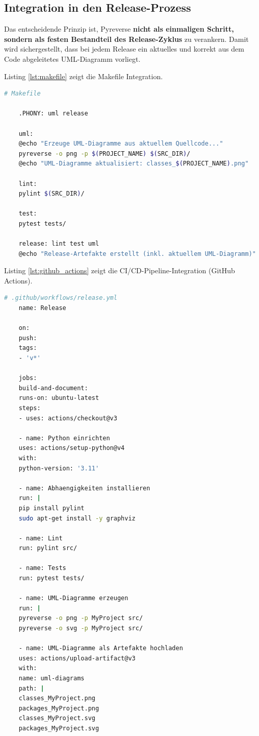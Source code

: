 ﻿\documentclass[a4paper,12pt]{article}
\begin{document}
\subsection{Integration in den Release-Prozess}

Das entscheidende Prinzip ist, Pyreverse \textbf{nicht als einmaligen Schritt,
sondern als festen Bestandteil des Release-Zyklus} zu verankern. Damit wird
sichergestellt, dass bei jedem Release ein aktuelles und korrekt aus dem Code
abgeleitetes UML-Diagramm vorliegt.

Listing \ref{lst:makefile} zeigt die Makefile Integration.
\begin{lstlisting}[language=bash, caption={Makefile mit Pyreverse-Ziel},
	label={lst:makefile}]
	# Makefile
	
	.PHONY: uml release
	
	uml:
	@echo "Erzeuge UML-Diagramme aus aktuellem Quellcode..."
	pyreverse -o png -p $(PROJECT_NAME) $(SRC_DIR)/
	@echo "UML-Diagramme aktualisiert: classes_$(PROJECT_NAME).png"
	
	lint:
	pylint $(SRC_DIR)/
	
	test:
	pytest tests/
	
	release: lint test uml
	@echo "Release-Artefakte erstellt (inkl. aktuellem UML-Diagramm)"
\end{lstlisting}

Listing \ref{lst:github_actions} zeigt die CI/CD-Pipeline-Integration (GitHub Actions).
\begin{lstlisting}[language=bash, caption={GitHub Actions Workflow mit Pyreverse},
	label={lst:github_actions}]
	# .github/workflows/release.yml
	name: Release
	
	on:
	push:
	tags:
	- 'v*'
	
	jobs:
	build-and-document:
	runs-on: ubuntu-latest
	steps:
	- uses: actions/checkout@v3
	
	- name: Python einrichten
	uses: actions/setup-python@v4
	with:
	python-version: '3.11'
	
	- name: Abhaengigkeiten installieren
	run: |
	pip install pylint
	sudo apt-get install -y graphviz
	
	- name: Lint
	run: pylint src/
	
	- name: Tests
	run: pytest tests/
	
	- name: UML-Diagramme erzeugen
	run: |
	pyreverse -o png -p MyProject src/
	pyreverse -o svg -p MyProject src/
	
	- name: UML-Diagramme als Artefakte hochladen
	uses: actions/upload-artifact@v3
	with:
	name: uml-diagrams
	path: |
	classes_MyProject.png
	packages_MyProject.png
	classes_MyProject.svg
	packages_MyProject.svg
\end{lstlisting}
\end{document}
